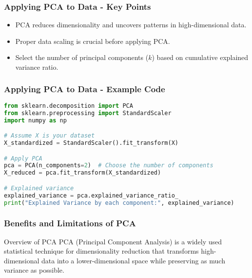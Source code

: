 \documentclass[aspectratio=169]{beamer}
\begin{document}
\begin{frame}[fragile]
    \frametitle{Applying PCA to Data - Key Points}
    \begin{itemize}
        \item PCA reduces dimensionality and uncovers patterns in high-dimensional data.
        \item Proper data scaling is crucial before applying PCA.
        \item Select the number of principal components (\(k\)) based on cumulative explained variance ratio.
    \end{itemize}
\end{frame}

\begin{frame}[fragile]
    \frametitle{Applying PCA to Data - Example Code}
    \begin{lstlisting}[language=Python]
from sklearn.decomposition import PCA
from sklearn.preprocessing import StandardScaler
import numpy as np

# Assume X is your dataset
X_standardized = StandardScaler().fit_transform(X)

# Apply PCA
pca = PCA(n_components=2)  # Choose the number of components
X_reduced = pca.fit_transform(X_standardized)

# Explained variance
explained_variance = pca.explained_variance_ratio_
print("Explained Variance by each component:", explained_variance)
    \end{lstlisting}
\end{frame}

\begin{frame}[fragile]
    \frametitle{Benefits and Limitations of PCA}
    \begin{block}{Overview of PCA}
        PCA (Principal Component Analysis) is a widely used statistical technique for dimensionality reduction that transforms high-dimensional data into a lower-dimensional space while preserving as much variance as possible.
    \end{block}
\end{frame}
\end{document}
